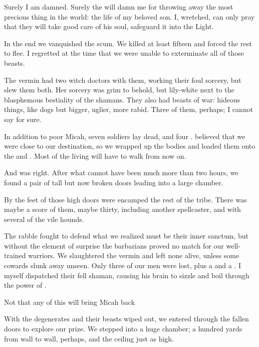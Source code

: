\begin{diary}
Surely I am damned. 
Surely the \sephiroth{} will damn me for throwing away the most precious thing in the world: 
the life of my beloved son. 
I, wretched, can only pray that they will take good care of his soul, safeguard it into the Light. 

In the end we vanquished the scum. 
We killed at least fifteen and forced the rest to flee. 
I regretted at the time that we were unable to exterminate all of those beasts. 

The vermin had two witch doctors with them, working their foul sorcery, but \Miss{} \Takestsha{} slew them both. 
Her \Rethyactic{} sorcery was grim to behold, but lily-white next to the blasphemous bestiality of the \EreshKali{} shamans. 
They also had beasts of war: hideous things, like dogs but bigger, uglier, more rabid. 
Three of them, perhaps; I cannot say for sure. 

In addition to poor Micah, seven soldiers lay dead, and four \relcs. 
\Takestsha{} believed that we were close to our destination, so we wrapped up the bodies and loaded them onto the \relcs{} and \belwans. 
Most of the living will have to walk from now on. 

And \Takestsha{} was right. 
After what cannot have been much more than two hours, we found a pair of tall but now broken doors leading into a large chamber. 

By the feet of those high doors were encamped the rest of the \meccaran{} tribe. 
There was maybe a score of them, maybe thirty, including another spellcaster, and with several of the vile hounds. 

The rabble fought to defend what we realized must be their inner sanctum, but without the element of surprise the barbarians proved no match for our well-trained warriors. 
We slaughtered the vermin and left none alive, unless some cowards slunk away unseen. 
Only three of our men were lost, plus a \relc{} and a \belwan{}. 
I myself dispatched their fell shaman, causing his brain to sizzle and boil through the power of \Razilah. 

Not that any of this will bring Micah back\prikker 

With the degenerates and their beasts wiped out, we entered through the fallen doors to explore our prize. 
We stepped into a huge chamber; a hundred yards from wall to wall, perhaps, 
and the ceiling just as high. 


\end{diary}
